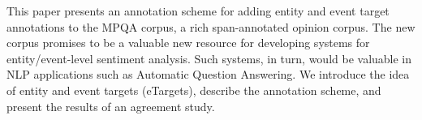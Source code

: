 This paper presents an annotation scheme for adding entity and event target annotations to the MPQA corpus, a rich span-annotated opinion corpus. The new corpus promises to be a valuable new resource for developing systems for entity/event-level sentiment analysis. Such systems, in turn, would be valuable in NLP applications such as Automatic Question Answering. We introduce the idea of entity and event targets (eTargets), describe the annotation scheme, and present the results of an agreement study.
